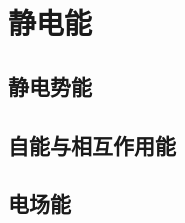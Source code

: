 

\section{静电能}\label{10-3}

\subsection{静电势能}\label{10-3-1}

\subsection{自能与相互作用能}\label{10-3-2}

\subsection{电场能}\label{10-3-3}